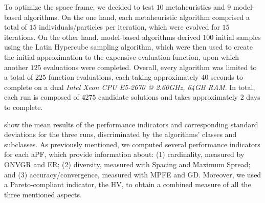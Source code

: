 To optimize the space frame, we decided to test $10$ metaheuristics and $9$ model-based algorithms. On the one hand, each metaheuristic algorithm comprised a total of $15$ individuals/particles per iteration, which were evolved for $15$ iterations. On the other hand, model-based algorithms derived $100$ initial samples using the Latin Hypercube sampling algorithm, which were then used to create the initial approximation to the expensive evaluation function, upon which another $125$ evaluations were completed. Overall, every algorithm was limited to a total of $225$ function evaluations, each taking approximately $40$ seconds to complete on a dual \textit{Intel Xeon CPU E5-2670 @ 2.60GHz, 64GB RAM}. In total, each run is composed of $4275$ candidate solutions and takes approximately $2$ days to complete.

 show the mean results of the performance indicators and corresponding standard deviations for the three runs, discriminated by the algorithms' classes and subclasses. As previously mentioned, we computed several performance indicators for each \ac{aPF}, which provide information about: (1) cardinality, measured by \ac{ONVGR} and \ac{ER}; (2) diversity, measured with Spacing and Maximum Spread; and (3) accuracy/convergence, measured with \ac{MPFE} and \ac{GD}. Moreover, we used a Pareto-compliant indicator, the \ac{HV}, to obtain a combined measure of all the three mentioned aspects. %

